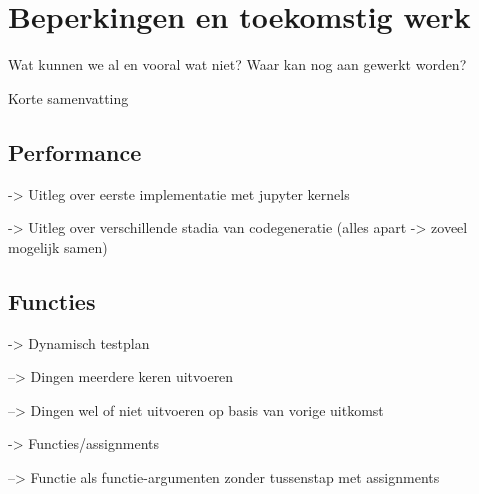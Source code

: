 \chapter{Beperkingen en toekomstig werk}\label{ch:beperkingen-en-toekomstig-werk}

Wat kunnen we al en vooral wat niet?
Waar kan nog aan gewerkt worden?

Korte samenvatting

\section{Performance}

-> Uitleg over eerste implementatie met jupyter kernels

-> Uitleg over verschillende stadia van codegeneratie (alles apart -> zoveel mogelijk samen)

\section{Functies}

-> Dynamisch testplan

--> Dingen meerdere keren uitvoeren

--> Dingen wel of niet uitvoeren op basis van vorige uitkomst


-> Functies/assignments

--> Functie als functie-argumenten zonder tussenstap met assignments

